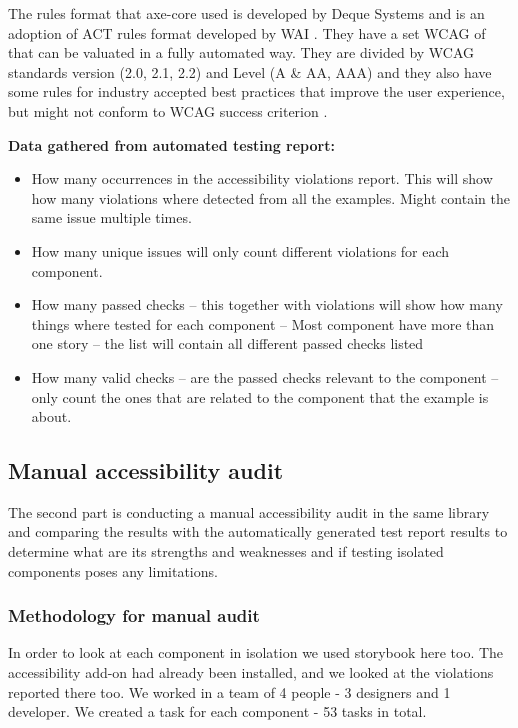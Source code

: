 \documentclass{master_thesis}
\begin{document}
The rules format that axe-core used is developed by Deque Systems and is an adoption of ACT rules format developed by WAI \citep{Fiers2017}. They have a set WCAG of that can be valuated in a fully automated way. They are divided  by WCAG standards version (2.0, 2.1, 2.2) and Level (A \& AA, AAA) and they also have some rules for industry accepted best practices that improve the user experience, but might not conform to WCAG success criterion \citep{Fiers2023}.

\textbf{Data gathered from automated testing report:}
\begin{itemize}
	\item How many occurrences in the accessibility violations report. This will show how many violations where detected from all the examples. Might contain the same issue multiple times.
	\item How many unique issues will only count different violations for each component.
	\item How many passed checks – this together with violations will show how many things where tested for each component – Most component have more than one story – the list will contain all different passed checks listed
	\item How many valid checks – are the passed checks relevant to the component – only count the ones that are related to the component that the example is about.
\end{itemize}


\subsection{Manual accessibility audit}

The second part is conducting a manual accessibility audit in the same library and comparing the results with the automatically generated test report results to determine what are its strengths and weaknesses and if testing isolated components poses any limitations.
\subsubsection{Methodology for manual audit}
In order to look at each component in isolation we used storybook here too. The accessibility add-on had already been installed, and we looked at the violations reported there too. We worked in a team of 4 people - 3 designers and 1 developer. We created a task for each component - 53 tasks in total.
\end{document}
